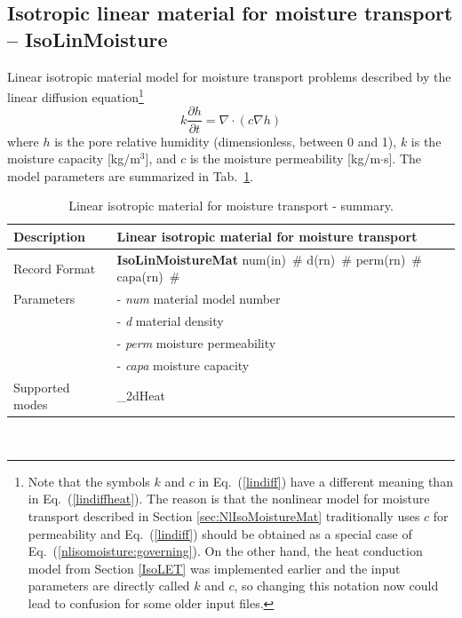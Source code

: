 \documentclass[a4paper]{article}
\newcommand{\descitem}[1]{{\noindent \bf #1}}
\newcommand{\elemparam}[2]{{{#1\tiny (#2)}~\#}}
\newcommand{\param}[1]{{\it #1}}
\newcommand{\refeq}[1]{Eq.~(\ref{#1})}
\newenvironment{mmt}{\begin{tabular}{|l|p{9cm}|}}{\end{tabular}\\}
\newenvironment{mmt}{\begin{tabular}{|l|l|}}{\end{tabular}\\}
\begin{document}
\subsection{Isotropic linear material for moisture transport -- IsoLinMoisture}
\label{IsoLinMoistureMat}
Linear isotropic material model for moisture transport problems described
by the linear diffusion equation\footnote{Note that the symbols $k$ and $c$
in \refeq{lindiff} have a different meaning than in \refeq{lindiffheat}.
The reason is that the nonlinear model for moisture transport described
in Section \ref{sec:NlIsoMoistureMat} traditionally
uses $c$ for permeability and \refeq{lindiff} should be obtained
as a special case of \refeq{nlisomoisture:governing}. 
On the other hand, the heat conduction model
from Section \ref{IsoLET} was implemented earlier and the input parameters
are directly called $k$ and $c$, so changing this notation now could lead
to confusion for some older input files.}
\begin{equation}\label{lindiff}
k\frac{\partial h}{\partial t} = \nabla \cdot \left( c \nabla h \right)
\end{equation}
where $h$ is the pore relative humidity (dimensionless, between 0 and 1), 
$k$ is the moisture capacity [kg/m$^3$],
and $c$ is the moisture permeability [kg/m$\cdot$s].
The model parameters are summarized
in Tab.~\ref{IsoLinmoistureMat_table}.

\begin{table}[!htb]
\begin{mmt}
\hline
Description & Linear isotropic material for moisture transport\\
\hline
Record Format & \descitem{IsoLinMoistureMat} \elemparam{num}{in}
\elemparam{d}{rn} \elemparam{perm}{rn} \elemparam{capa}{rn}\\
Parameters &- \param{num} material model number\\
&- \param{d} material density\\
&- \param{perm} moisture permeability\\
&- \param{capa} moisture capacity\\
Supported modes& \_2dHeat\\
\hline
\end{mmt}
\caption{Linear isotropic material for moisture transport - summary.}
\label{IsoLinmoistureMat_table}
\end{table}
\end{document}
